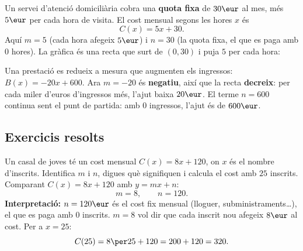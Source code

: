 \begin{exemple}
Un servei d'atenció domiciliària cobra una \textbf{quota fixa} de $30\eur$ al mes,
més $5\eur$ per cada hora de visita. El cost mensual segons les hores $x$ és
\[
C(x)=5x+30.
\]
Aquí $m=5$ (cada hora afegeix $5\eur$) i $n=30$ (la quota fixa, el que es paga amb
$0$ hores). La gràfica és una recta que surt de $(0,30)$ i puja $5$ per cada hora:

\begin{center}

\end{center}
\end{exemple}

\begin{exemple}
Una prestació es redueix a mesura que augmenten els ingressos: $B(x)=-20x+600$.
Ara $m=-20$ és \textbf{negatiu}, així que la recta \textbf{decreix}: per cada miler
d'euros d'ingressos més, l'ajut baixa $20\eur$. El terme $n=600$ continua sent el
punt de partida: amb $0$ ingressos, l'ajut és de $600\eur$.
\end{exemple}

\subsection{Exercicis resolts}

\begin{exresolt}
Un casal de joves té un cost mensual $C(x)=8x+120$, on $x$ és el nombre d'inscrits.
Identifica $m$ i $n$, digues què signifiquen i calcula el cost amb $25$ inscrits.
\solucio
Comparant $C(x)=8x+120$ amb $y=mx+n$:
\[
m=8, \qquad n=120.
\]
\textbf{Interpretació:} $n=120\eur$ és el cost fix mensual (lloguer, subministraments…),
el que es paga amb $0$ inscrits. $m=8$ vol dir que cada inscrit nou afegeix $8\eur$
al cost. Per a $x=25$:
\[
C(25)=8\per 25+120=200+120=320.
\]
\end{exresolt}

